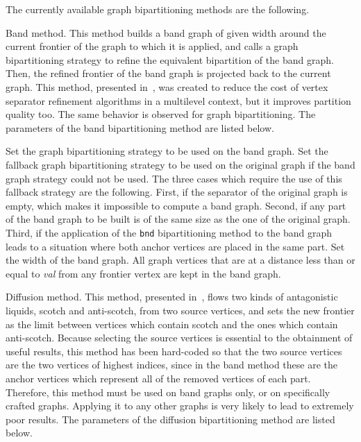 The currently available graph bipartitioning methods are the following.
\begin{itemize}
\iteme[{\tt b}]
Band method. This method builds a band graph of given width around the
current frontier of the graph to which it is applied, and
calls a graph bipartitioning strategy to refine the equivalent
bipartition of the band graph. Then, the refined frontier of the band
graph is projected back to the current graph. This method, presented
in~\cite{chpe06a}, was created to reduce the cost of vertex separator
refinement algorithms in a multilevel context, but it improves
partition quality too. The same behavior is observed for graph
bipartitioning. The parameters of the band bipartitioning method are
listed below.
\begin{itemize}
\iteme[{\tt bnd=}{\it strat}]
Set the graph bipartitioning strategy to be used on the band graph.
\iteme[{\tt org=}{\it strat}]
Set the fallback graph bipartitioning strategy to be used on the
original graph if the band graph strategy could not be used. The three
cases which require the use of this fallback strategy are the
following. First, if the separator of the original graph is empty,
which makes it impossible to compute a band graph. Second, if any part
of the band graph to be built is of the same size as the one of the
original graph. Third, if the application of the {\tt bnd}
bipartitioning method to the band graph leads to a situation where both
anchor vertices are placed in the same part.
\iteme[{\tt width=}{\it val}]
Set the width of the band graph. All graph vertices that are at a
distance less than or equal to {\it val} from any frontier vertex
are kept in the band graph.
\end{itemize}
\iteme[{\tt d}]
Diffusion method. This method, presented in~\cite{pell07b}, flows two
kinds of antagonistic liquids, scotch and anti-scotch, from two source
vertices, and sets the new frontier as the limit between vertices
which contain scotch and the ones which contain anti-scotch. Because
selecting the source vertices is essential to the obtainment of useful
results, this method has been hard-coded so that the two source
vertices are the two vertices of highest indices, since in the band
method these are the anchor vertices which represent all of the removed
vertices of each part. Therefore, this method must be used on band
graphs only, or on specifically crafted graphs. Applying it to any
other graphs is very likely to lead to extremely poor results.
The parameters of the diffusion bipartitioning method are
listed below.
\begin{itemize}

\end{itemize}
\end{itemize}
